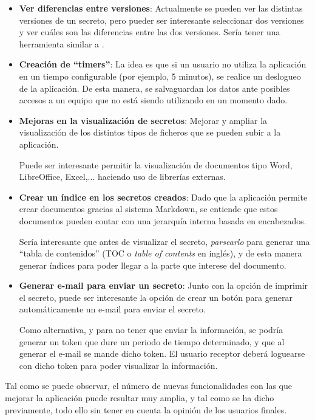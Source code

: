 \documentclass{\ClassPath/viu-tfm-template}
\begin{document}
\begin{itemize}
    \item \textbf{Ver diferencias entre versiones}: Actualmente se pueden ver las distintas versiones de un secreto, pero pueder ser interesante seleccionar dos versiones y ver cuáles son las diferencias entre las dos versiones. Sería tener una herramienta similar a .

    \item \textbf{Creación de “timers”}: La idea es que si un usuario no utiliza la aplicación en un tiempo configurable (por ejemplo, 5 minutos), se realice un deslogueo de la aplicación. De esta manera, se salvaguardan los datos ante posibles accesos a un equipo que no está siendo utilizando en un momento dado.

    \item \textbf{Mejoras en la visualización de secretos}: Mejorar y ampliar la visualización de los distintos tipos de ficheros que se pueden subir a la aplicación.

    Puede ser interesante permitir la visualización de documentos tipo Word, LibreOffice, Excel,... haciendo uso de librerías externas.

    \item \textbf{Crear un índice en los secretos creados}: Dado que la aplicación permite crear documentos gracias al sistema Markdown, se entiende que estos documentos pueden contar con una jerarquía interna basada en encabezados.

    Sería interesante que antes de visualizar el secreto, \textit{parsearlo} para generar una “tabla de contenidos” (TOC o \textit{table of contents} en inglés), y de esta manera generar índices para poder llegar a la parte que interese del documento.

    \item \textbf{Generar e-mail para enviar un secreto}: Junto con la opción de imprimir el secreto, puede ser interesante la opción de crear un botón para generar automáticamente un e-mail para enviar el secreto.

    Como alternativa, y para no tener que enviar la información, se podría generar un token que dure un periodo de tiempo determinado, y que al generar el e-mail se mande dicho token. El usuario receptor deberá loguearse con dicho token para poder visualizar la información.
\end{itemize}

Tal como se puede observar, el número de nuevas funcionalidades con las que mejorar la aplicación puede resultar muy amplia, y tal como se ha dicho previamente, todo ello sin tener en cuenta la opinión de los usuarios finales.
\end{document}
